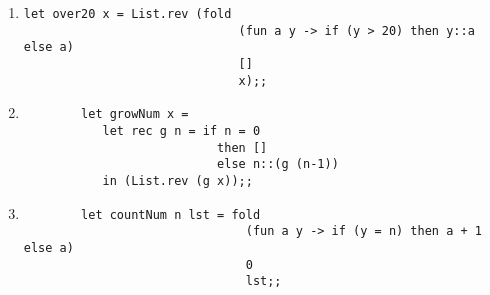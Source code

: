 \documentclass[11pt]{article}
\begin{document}
\begin{enumerate}
\begin{enumerate}
            \item \begin{Verbatim}[gobble=4]
    let over20 x = List.rev (fold
                              (fun a y -> if (y > 20) then y::a else a)
                              []
                              x);;
                  \end{Verbatim}

            \item \begin{Verbatim}
        let growNum x =
           let rec g n = if n = 0
                           then []
                           else n::(g (n-1))
           in (List.rev (g x));;
            \end{Verbatim}

            \item \begin{Verbatim}
        let countNum n lst = fold
                               (fun a y -> if (y = n) then a + 1 else a)
                               0
                               lst;;
                  \end{Verbatim}

          \end{enumerate}

          \vspace{-2.5mm}

  \end{enumerate}
\end{document}
